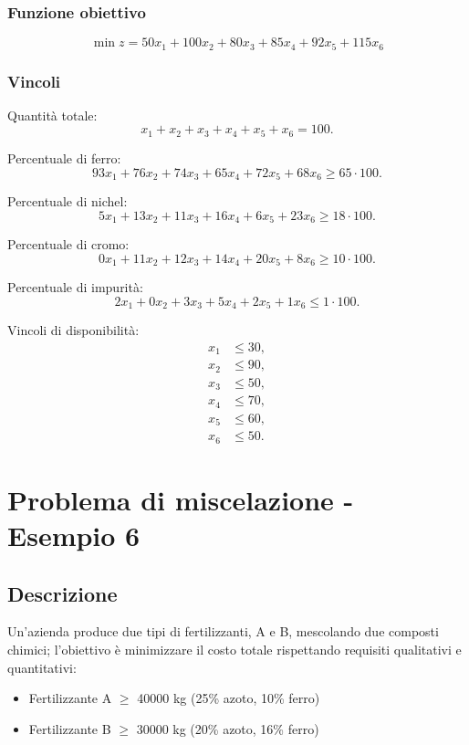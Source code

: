 \subsubsection{Funzione obiettivo}
\[
\min z = 50x_1 + 100x_2 + 80x_3 + 85x_4 + 92x_5 + 115x_6
\]

\subsubsection{Vincoli}
Quantità totale:
\[
x_1+x_2+x_3+x_4+x_5+x_6 = 100.
\]

Percentuale di ferro:
\[
93x_1+76x_2+74x_3+65x_4+72x_5+68x_6 \geq 65\cdot 100.
\]

Percentuale di nichel:
\[
5x_1+13x_2+11x_3+16x_4+6x_5+23x_6 \geq 18\cdot 100.
\]

Percentuale di cromo:
\[
0x_1+11x_2+12x_3+14x_4+20x_5+8x_6 \geq 10\cdot 100.
\]

Percentuale di impurità:
\[
2x_1+0x_2+3x_3+5x_4+2x_5+1x_6 \leq 1\cdot 100.
\]

Vincoli di disponibilità:
\[
\begin{aligned}
x_1 &\leq 30, \\
x_2 &\leq 90, \\
x_3 &\leq 50, \\
x_4 &\leq 70, \\
x_5 &\leq 60, \\
x_6 &\leq 50.
\end{aligned}
\]
 
\section{Problema di miscelazione - Esempio 6}

\subsection{Descrizione}
Un'azienda produce due tipi di fertilizzanti, A e B, mescolando due composti chimici; l'obiettivo è minimizzare il costo totale rispettando requisiti qualitativi e quantitativi:
\begin{itemize}
    \item Fertilizzante A $\geq$ 40000 kg (25\% azoto, 10\% ferro)
    \item Fertilizzante B $\geq$ 30000 kg (20\% azoto, 16\% ferro)
\end{itemize}

